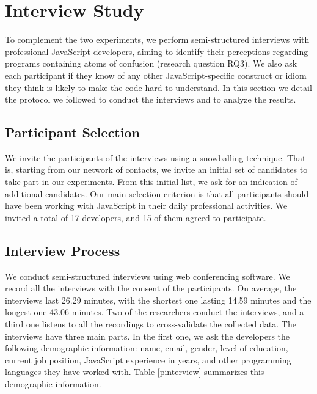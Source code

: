 \section{Interview Study}\label{sec:s03}

To complement the two experiments, we perform semi-structured interviews with professional JavaScript developers, aiming to identify their perceptions regarding programs containing atoms of confusion (research question RQ3). We also ask each participant if they know of any other JavaScript-specific construct or idiom they think is likely to make the code hard to understand. %
In this section we detail the protocol we followed to conduct the interviews and to analyze the results.


\subsection{Participant Selection} We invite the participants of the interviews using a snowballing technique. That is, starting from our network of contacts, we invite an initial set of candidates to take part in our experiments. From this initial list, we ask for an indication of additional candidates. Our main selection criterion is that all participants should have been working with JavaScript in their daily professional activities. We invited a total of 17 developers, and 15 of them agreed to participate.   


\subsection{Interview Process} We conduct semi-structured interviews using web conferencing software. We record all the interviews with the consent of the participants. On average, the interviews last 26.29 minutes, with the shortest one lasting 14.59 minutes and the longest one 43.06 minutes. Two of the researchers conduct the interviews, and a third one listens to all the recordings to cross-validate the collected data. The interviews have three main parts. In the first one, we ask the developers the following demographic information: name, email, gender, level of education, current job position, JavaScript experience in years, and other programming languages they have worked with. Table \ref{pinterview} summarizes this demographic information.

